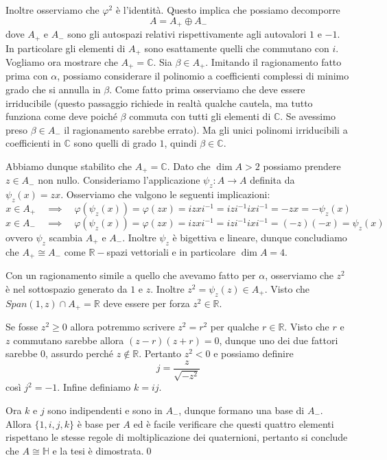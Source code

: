 \documentclass[11pt]{article}
\theoremstyle{plain}
\theoremstyle{definition}
\theoremstyle{remark}
\newcommand{\C}{\mathbb{C}}
\newcommand{\R}{\mathbb{R}}
\newcommand{\HH}{\mathbb{H}}
\begin{document}
Inoltre osserviamo che $\varphi^2$ è l'identità. Questo implica che possiamo decomporre
\[ A = A_+ \oplus A_-\] dove $A_+$ e $A_-$ sono gli autospazi relativi rispettivamente agli autovalori $1$ e $-1$.
In particolare gli elementi di $A_+$ sono esattamente quelli che commutano con $i$.
Vogliamo ora mostrare che $A_+ = \C$.
Sia $\beta\in A_+$. Imitando il ragionamento fatto prima con $\alpha$, possiamo considerare il polinomio a coefficienti complessi di minimo grado
che si annulla in $\beta$. Come fatto prima osserviamo che deve essere irriducibile (questo passaggio richiede in realtà qualche cautela,
ma tutto funziona come deve poiché $\beta$ commuta con tutti gli elementi di $\C$. Se avessimo preso $\beta\in A_-$ il ragionamento sarebbe errato).
Ma gli unici polinomi irriducibili a coefficienti in $\C$ sono quelli di grado $1$, quindi $\beta\in\C$.

Abbiamo dunque stabilito che $A_+ = \C$. Dato che $\dim A > 2$ possiamo prendere $z\in A_-$ non nullo.
Consideriamo l'applicazione $\psi_z:A\to A$ definita da $\psi_z(x) = zx$.
Osserviamo che valgono le seguenti implicazioni:
\[ x\in A_+ \quad\implies\quad \varphi(\psi_z(x)) = \varphi(zx) = izxi^{-1} = izi^{-1}ixi^{-1} = -zx = -\psi_z(x)\]
\[ x\in A_- \quad\implies\quad \varphi(\psi_z(x)) = \varphi(zx) = izxi^{-1} = izi^{-1}ixi^{-1} = (-z)(-x) = \psi_z(x)\]
ovvero $\psi_z$ scambia $A_+$ e $A_-$. Inoltre $\psi_z$ è bigettiva e lineare, dunque concludiamo che $A_+\cong A_-$ come $\R-$spazi vettoriali e in particolare $\dim A = 4$.

Con un ragionamento simile a quello che avevamo fatto per $\alpha$, osserviamo che $z^2$ è nel sottospazio generato da $1$ e $z$. Inoltre $z^2=\psi_z(z)\in A_+$.
Visto che $Span(1,z) \cap A_+ = \R$ deve essere per forza $z^2\in\R$.



Se fosse $z^2 \ge 0$ allora potremmo scrivere $z^2=r^2$ per qualche $r\in\R$.
Visto che $r$ e $z$ commutano sarebbe allora $(z-r)(z+r)=0$, dunque uno dei due fattori sarebbe $0$, assurdo perché $z\not\in\R$. Pertanto $z^2 < 0$ e possiamo definire
\[j = \frac{z}{\sqrt{-z^2}}\]
così $j^2 = -1$. Infine definiamo $k = ij$.

Ora $k$ e $j$ sono indipendenti e sono in $A_-$, dunque formano una base di $A_-$. Allora $\{1,i,j,k\}$ è base per $A$ ed è facile
verificare che questi quattro elementi rispettano le stesse regole di moltiplicazione dei quaternioni, pertanto si conclude che $A\cong\HH$ e la tesi è dimostrata.\qed
\end{document}
